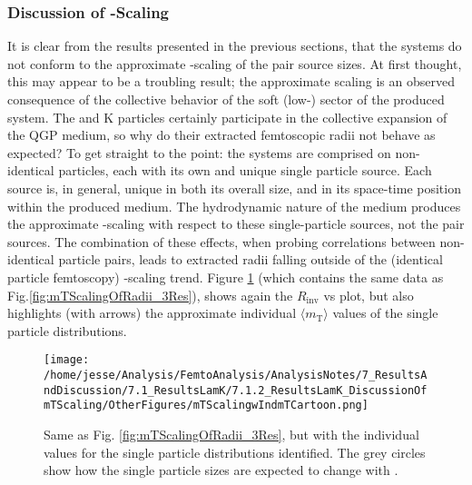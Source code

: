 \documentclass[/home/jesse/Analysis/FemtoAnalysis/AnalysisNotes/AnalysisNoteJBuxton.tex]{subfiles}
\begin{document}
\subsubsection{Discussion of \mt-Scaling}
\label{ResultsLamK_DiscussionOfmTScaling}

It is clear from the results presented in the previous sections, that the \LamK systems do not conform to the approximate \mt-scaling of the pair source sizes. 
At first thought, this may appear to be a troubling result; the approximate scaling is an observed consequence of the collective behavior of the soft (low-\pt) sector of the produced system.
The \Lam and K  particles certainly participate in the collective expansion of the QGP medium, so why do their extracted femtoscopic radii not behave as expected?
To get straight to the point: the \LamK systems are comprised on non-identical particles, each with its own and unique single particle source.
Each source is, in general, unique in both its overall size, and in its space-time position within the produced medium.
The hydrodynamic nature of the medium produces the approximate \mt-scaling with respect to these single-particle sources, not the pair sources.
The combination of these effects, when probing correlations between non-identical particle pairs, leads to extracted radii falling outside of the (identical particle femtoscopy) \mt-scaling trend.
Figure \ref{fig:mTScalingOfRadii_3ReswIndmTCartoon} (which contains the same data as Fig.\ref{fig:mTScalingOfRadii_3Res}), shows again the $R_{\mathrm{inv}}$ vs \mt plot, but also highlights (with arrows) the approximate individual $\langle m_{\mathrm{T}} \rangle$ values of the single particle distributions.

\begin{figure}[h!]
  \centering
  \texttt{[image: /home/jesse/Analysis/FemtoAnalysis/AnalysisNotes/7\_ResultsAndDiscussion/7.1\_ResultsLamK/7.1.2\_ResultsLamK\_DiscussionOfmTScaling/OtherFigures/mTScalingwIndmTCartoon.png]}
  \caption[$m_{\mathrm{T}}$ scaling of radii with individual \mt highlighted]{Same as Fig. \ref{fig:mTScalingOfRadii_3Res}, but with the individual \mt values for the single particle distributions identified.  The grey circles show how the single particle sizes are expected to change with \mt.}
  \label{fig:mTScalingOfRadii_3ReswIndmTCartoon}
\end{figure}
\end{document}
